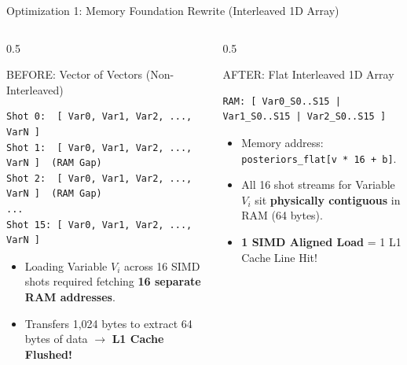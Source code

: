 \begin{frame}[fragile]{Optimization 1: Memory Foundation Rewrite (Interleaved 1D Array)}
    \begin{columns}[T]
        \begin{column}{0.5\textwidth}
            \begin{block}{\textcolor{googlered}{BEFORE}: Vector of Vectors (Non-Interleaved)}
                \tiny
                \begin{verbatim}
Shot 0:  [ Var0, Var1, Var2, ..., VarN ]
Shot 1:  [ Var0, Var1, Var2, ..., VarN ]  (RAM Gap)
Shot 2:  [ Var0, Var1, Var2, ..., VarN ]  (RAM Gap)
...
Shot 15: [ Var0, Var1, Var2, ..., VarN ]
                \end{verbatim}
                \normalsize
                \begin{itemize}
                    \item Loading Variable $V_i$ across 16 SIMD shots required fetching \textbf{16 separate RAM addresses}.
                    \item Transfers 1,024 bytes to extract 64 bytes of data $\rightarrow$ \textbf{L1 Cache Flushed!}
                \end{itemize}
            \end{block}
        \end{column}
        
        \begin{column}{0.5\textwidth}
            \begin{block}{\textcolor{googlegreen}{AFTER}: Flat Interleaved 1D Array}
                \tiny
                \begin{verbatim}
RAM: [ Var0_S0..S15 | Var1_S0..S15 | Var2_S0..S15 ]
                \end{verbatim}
                \normalsize
                \begin{itemize}
                    \item Memory address: \texttt{posteriors\_flat[v * 16 + b]}.
                    \item All 16 shot streams for Variable $V_i$ sit \textbf{physically contiguous} in RAM (64 bytes).
                    \item \textbf{1 SIMD Aligned Load} = 1 L1 Cache Line Hit!
                \end{itemize}
            \end{block}
        \end{column}
    \end{columns}
\end{frame}

